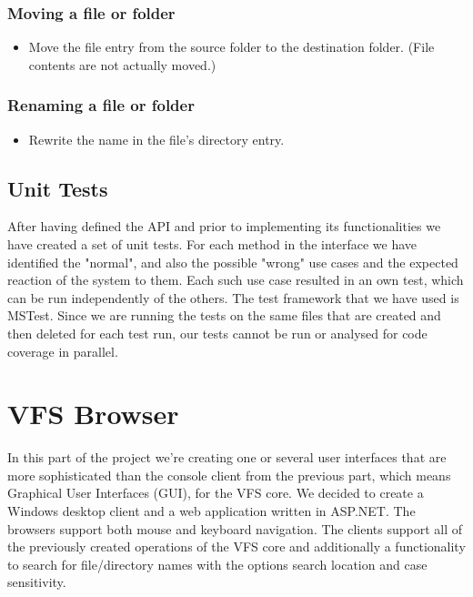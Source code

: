 \documentclass[a4paper,12pt]{article}
\begin{document}
\subsubsection{Moving a file or folder}\label{moving-a-file-or-folder}
    \begin{itemize}
        \itemsep1pt\parskip0pt
        \item{Move the file entry from the source folder to the destination folder. (File contents are not actually moved.)}
    \end{itemize}

\subsubsection{Renaming a file or folder}\label{renaming-a-file-or-folder}
    \begin{itemize}
        \itemsep1pt\parskip0pt
        \item{Rewrite the name in the file's directory entry.}
    \end{itemize}

\subsection{Unit Tests}
After having defined the API and prior to implementing its functionalities we have created a set of unit tests. For each method in the interface we have identified the "normal", and also the possible "wrong" use cases and the expected reaction of the system to them. Each such use case resulted in an own test, which can be run independently of the others. The test framework that we have used is MSTest.\newline
Since we are running the tests on the same files that are created and then deleted for each test run, our tests cannot be run or analysed for code coverage in parallel.




\section{VFS Browser}
In this part of the project we're creating one or several user interfaces that are more sophisticated than the console client from the previous part, which means Graphical User Interfaces (GUI), for the VFS core. We decided to create a Windows desktop client and a web application written in ASP.NET. The browsers support both mouse and keyboard navigation. \newline
The clients support all of the previously created operations of the VFS core and additionally a functionality to search for file/directory names with the options search location and case sensitivity.
\end{document}
